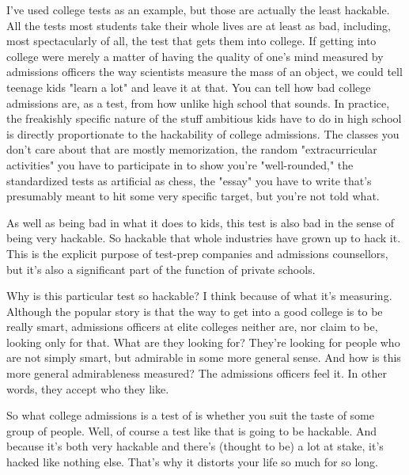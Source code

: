 I've
                  used college tests as an example, but those are actually the
                  least hackable. All the tests most students take their whole
                  lives are at least as bad, including, most spectacularly of
                  all, the test that gets them into college. If getting into
                  college were merely a matter of having the quality of one's
                  mind measured by admissions officers the way scientists
                  measure the mass of an object, we could tell teenage kids
                  "learn a lot" and leave it at that. You can tell how bad
                  college admissions are, as a test, from how unlike high school
                  that sounds. In practice, the freakishly specific nature of
                  the stuff ambitious kids have to do in high school is directly
                  proportionate to the hackability of college admissions. The
                  classes you don't care about that are mostly memorization, the
                  random "extracurricular activities" you have to participate in
                  to show you're "well-rounded," the standardized tests as
                  artificial as chess, the "essay" you have to write that's
                  presumably meant to hit some very specific target, but you're
                  not told what.

As well as being bad in what it does
                  to kids, this test is also bad in the sense of being very
                  hackable. So hackable that whole industries have grown up to
                  hack it. This is the explicit purpose of test-prep companies
                  and admissions counsellors, but it's also a significant part
                  of the function of private schools.

Why is this
                  particular test so hackable? I think because of what it's
                  measuring. Although the popular story is that the way to get
                  into a good college is to be really smart, admissions officers
                  at elite colleges neither are, nor claim to be, looking only
                  for that. What are they looking for? They're looking for
                  people who are not simply smart, but admirable in some more
                  general sense. And how is this more general admirableness
                  measured? The admissions officers feel it. In other words,
                  they accept who they like.

So what college
                  admissions is a test of is whether you suit the taste of some
                  group of people. Well, of course a test like that is going to
                  be hackable. And because it's both very hackable and there's
                  (thought to be) a lot at stake, it's hacked like nothing else.
                  That's why it distorts your life so much for so long.


